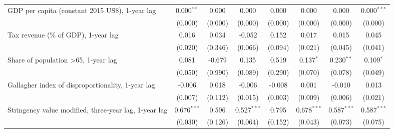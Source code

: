 \begin{table}[htbp]
\begin{tabular}{lccccccc}
      GDP per capita (constant 2015 US\$), 1-year lag                                           & 0.000$^{**}$  & 0.000                     & 0.000          & 0.000            & 0.000           & 0.000           & 0.000$^{***}$\\   
                                                                                                & (0.000)       & (0.000)                   & (0.000)        & (0.000)          & (0.000)         & (0.000)         & (0.000)\\   
      Tax revenue (\% of GDP), 1-year lag                                                       & 0.016         & 0.034                     & -0.052         & 0.152            & 0.017           & 0.015           & 0.045\\   
                                                                                                & (0.020)       & (0.346)                   & (0.066)        & (0.094)          & (0.021)         & (0.045)         & (0.041)\\   
      Share of population >65, 1-year lag                                                       & 0.081         & -0.679                    & 0.135          & 0.519            & 0.137$^{*}$     & 0.230$^{**}$    & 0.109$^{*}$\\   
                                                                                                & (0.050)       & (0.990)                   & (0.089)        & (0.290)          & (0.070)         & (0.078)         & (0.049)\\   
      Gallagher index of disproportionality, 1-year lag                                         & -0.006        & 0.018                     & -0.006         & -0.008           & 0.001           & -0.010          & 0.013\\   
                                                                                                & (0.007)       & (0.112)                   & (0.015)        & (0.003)          & (0.009)         & (0.006)         & (0.021)\\   
      Stringency value modified, three-year lag, 1-year lag                                     & 0.676$^{***}$ & 0.596                     & 0.527$^{***}$  & 0.795            & 0.678$^{***}$   & 0.587$^{***}$   & 0.587$^{***}$\\   
                                                                                                & (0.030)       & (0.126)                   & (0.064)        & (0.152)          & (0.043)         & (0.073)         & (0.075)\\   

\end{tabular}
\end{table}
